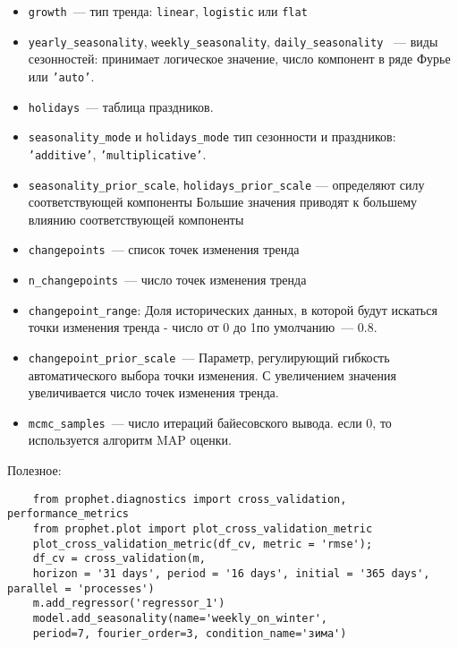 \documentclass[a4paper,14pt]{extarticle}
\begin{document}
\begin{itemize}
    \item \texttt{growth}~--- тип тренда: \texttt{linear}, \texttt{logistic}  или \texttt{flat}
    \item \texttt{yearly\_seasonality}, \texttt{weekly\_seasonality},  \texttt{daily\_seasonality}~ --- виды сезонностей: принимает логическое значение, число компонент в ряде Фурье или \texttt{'auto'}.
    \item  \texttt{holidays}~--- таблица праздников.
    \item \texttt{seasonality\_mode} и \texttt{holidays\_mode} тип сезонности и праздников: \texttt{'additive'}, \texttt{'multiplicative'}.
    \item \texttt{seasonality\_prior\_scale}, \texttt{holidays\_prior\_scale} --- определяют силу соответствующей компоненты
    Большие значения приводят к большему влиянию соответствующей компоненты
    \item \texttt{changepoints}~--- список точек изменения тренда
    \item \texttt{n\_changepoints}~--- число точек изменения тренда
    \item \texttt{changepoint\_range}: Доля исторических данных, в которой будут искаться точки изменения тренда - число от 0 до 1по умолчанию~--- 0.8.
    \item \texttt{changepoint\_prior\_scale}~--- Параметр, регулирующий гибкость автоматического выбора точки изменения. С увеличением значения увеличивается число точек изменения тренда.

    \item \texttt{mcmc\_samples}~--- число итераций байесовского вывода. если 0, то используется алгоритм MAP оценки.
\end{itemize}


\small
Полезное:
\begin{verbatim}
    from prophet.diagnostics import cross_validation, performance_metrics
    from prophet.plot import plot_cross_validation_metric
    plot_cross_validation_metric(df_cv, metric = 'rmse');
    df_cv = cross_validation(m,
    horizon = '31 days', period = '16 days', initial = '365 days', parallel = 'processes')            
    m.add_regressor('regressor_1')
    model.add_seasonality(name='weekly_on_winter', 
    period=7, fourier_order=3, condition_name='зима')

\end{verbatim}
\end{document}
